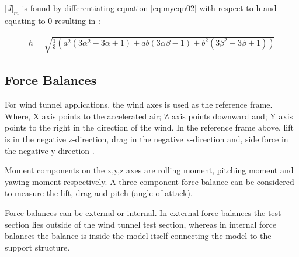  $|J|_{m}$ is found by differentiating equation \eqref{eq:myeqn02} with respect to h and equating to 0 resulting in \cite{fernandes_design_nodate}:
 \begin{ceqn}
 \begin{align}
 	h = \sqrt{\frac{1}{3}(a^2 (3 \alpha^2 - 3 \alpha + 1)+ ab (3\alpha\beta - 1)+b^2(3 \beta^2 - 3 \beta + 1))}
 	\label{eq:myeqn}
 \end{align}
 \end{ceqn}

\subsection{Force Balances}
For wind tunnel applications, the wind axes is used as the reference frame. Where, X axis points to the accelerated air; Z axis points downward and; Y axis points to the right in the direction of the wind. In the reference frame above, lift is in the negative z-direction, drag in the negative x-direction and, side force in the negative y-direction \cite{bueno2018design}.

Moment components on the x,y,z axes are rolling moment, pitching moment and yawing moment respectively. A three-component force balance can be considered to measure the lift, drag and pitch (angle of attack).

Force balances can be external or internal. In external force balances the test section lies outside of the wind tunnel test section, whereas in internal force balances the balance is inside the model itself connecting the model to the support structure.
